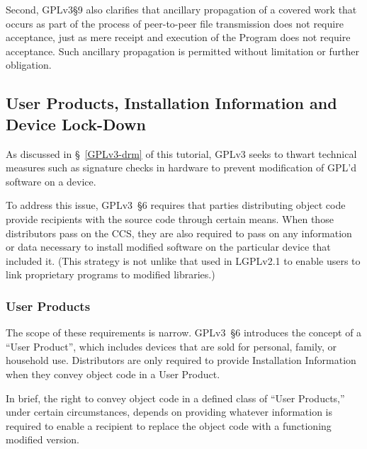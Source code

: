 Second, GPLv3\S9 also clarifies that ancillary propagation of a covered work
that occurs as part of the process of peer-to-peer file transmission does not
require acceptance, just as mere receipt and execution of the Program does
not require acceptance.  Such ancillary propagation is permitted without
limitation or further obligation.


\subsection{User Products, Installation Information and Device Lock-Down}

As discussed in \S~\ref{GPLv3-drm} of this tutorial, GPLv3 seeks to thwart
technical measures such as signature checks in hardware to prevent
modification of GPL'd software on a device.

To address this issue, GPLv3~\S6 requires that parties distributing object
code provide recipients with the source code through certain means.  When
those distributors pass on the CCS, they are also required to pass on any
information or data necessary to install modified software on the particular
device that included it.  (This strategy is not unlike that used in LGPLv2.1
to enable users to link proprietary programs to modified libraries.)


\subsubsection{User Products}

\label{user-product}

The scope of these requirements is narrow.  GPLv3~\S6 introduces the concept
of a ``User Product'', which includes devices that are sold for personal,
family, or household use.  Distributors are only required to provide
Installation Information when they convey object code in a User Product.

In brief, the right to convey object code in a defined class of ``User
Products,'' under certain circumstances, depends on providing whatever information
is required to enable a recipient to replace the object code with a functioning
modified version.

